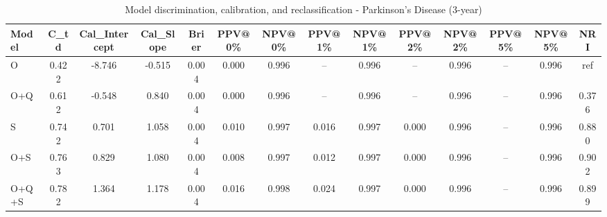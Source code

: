 \begin{table}[htbp]
\centering
\small
\caption{Model discrimination, calibration, and reclassification - Parkinson's Disease (3-year)}
\label{tab:perf_pd_3y}
\begin{tabular}{lccccccccccccc}
\toprule
Model & C\_td & Cal\_Intercept & Cal\_Slope & Brier & PPV@0\% & NPV@0\% & PPV@1\% & NPV@1\% & PPV@2\% & NPV@2\% & PPV@5\% & NPV@5\% & NRI \\
\midrule
O & 0.422 & -8.746 & -0.515 & 0.004 & 0.000 & 0.996 & -- & 0.996 & -- & 0.996 & -- & 0.996 & ref \\
O+Q & 0.612 & -0.548 & 0.840 & 0.004 & 0.000 & 0.996 & -- & 0.996 & -- & 0.996 & -- & 0.996 & 0.376 \\
S & 0.742 & 0.701 & 1.058 & 0.004 & 0.010 & 0.997 & 0.016 & 0.997 & 0.000 & 0.996 & -- & 0.996 & 0.880 \\
O+S & 0.763 & 0.829 & 1.080 & 0.004 & 0.008 & 0.997 & 0.012 & 0.997 & 0.000 & 0.996 & -- & 0.996 & 0.902 \\
O+Q+S & 0.782 & 1.364 & 1.178 & 0.004 & 0.016 & 0.998 & 0.024 & 0.997 & 0.000 & 0.996 & -- & 0.996 & 0.899 \\
\bottomrule
\end{tabular}
\end{table}